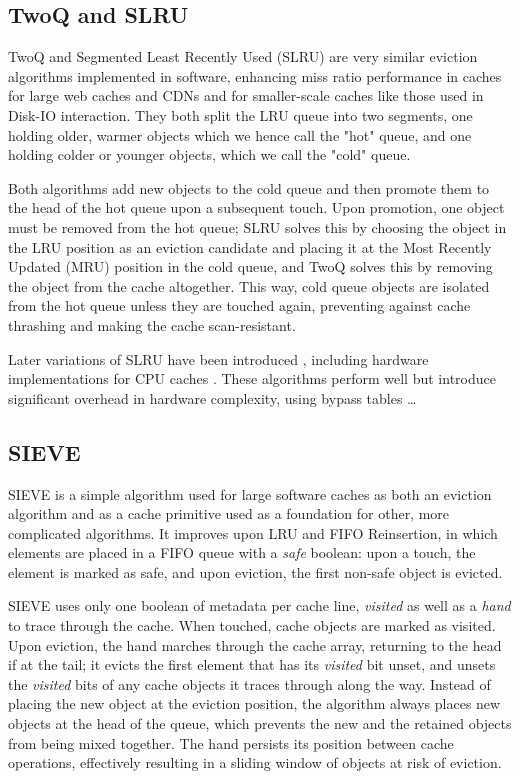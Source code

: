 \documentclass[letterpaper, twocolumn]{article}
\begin{document}
\subsection{TwoQ and SLRU}

TwoQ \cite{TwoQ} and Segmented Least Recently Used (SLRU) \cite{SLRU}
are very similar eviction algorithms implemented in software,
enhancing miss ratio performance in caches for large web caches and CDNs
and for smaller-scale caches like those used in Disk-IO interaction.
They both split the LRU queue into two segments, one holding older, warmer objects
which we hence call the "hot" queue,
and one holding colder or younger objects,
which we call the "cold" queue.

Both algorithms add new objects to the cold queue
and then promote them to the head of the hot queue upon a subsequent touch.
Upon promotion, one object must be removed from the hot queue;
SLRU solves this by choosing the object in the LRU position as an eviction candidate
and placing it at the Most Recently Updated (MRU) position in the cold queue,
and TwoQ solves this by removing the object from the cache altogether.
This way, cold queue objects are isolated from the hot queue unless they are touched again,
preventing against cache thrashing and making the cache scan-resistant.

Later variations of SLRU have been introduced \cite{SSLRU},
including hardware implementations for CPU caches
\cite{DuelingSLRU}\cite{LimitedSLRU}\cite{FixedSLRU}\cite{FixedSLRUEnhancements}.
These algorithms perform well but introduce significant overhead in hardware complexity,
using bypass tables \dots

\subsection{SIEVE}

SIEVE is a simple algorithm used for large software caches as both an eviction algorithm
and as a cache primitive used as a foundation for other, more complicated algorithms.
It improves upon LRU and FIFO Reinsertion,
in which elements are placed in a FIFO queue with a \textit{safe} boolean:
upon a touch, the element is marked as safe, and upon eviction,
the first non-safe object is evicted.

SIEVE uses only one boolean of metadata per cache line, \textit{visited}
as well as a \textit{hand} to trace through the cache.
When touched, cache objects are marked as visited.
Upon eviction, the hand marches through the cache array, returning to the head if at the tail;
it evicts the first element that has its \textit{visited} bit unset,
and unsets the \textit{visited} bits of any cache objects it traces through along the way.
Instead of placing the new object at the eviction position,
the algorithm always places new objects at the head of the queue,
which prevents the new and the retained objects from being mixed together.
The hand persists its position between cache operations,
effectively resulting in a sliding window of objects at risk of eviction.
\end{document}
